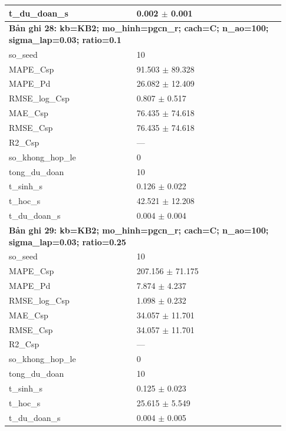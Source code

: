 \begin{longtable}{p{0.43\linewidth}p{0.50\linewidth}}
t\_\allowbreak du\_\allowbreak doan\_\allowbreak s & 0.002 $\pm$ 0.001 \\
\midrule
\multicolumn{2}{p{0.95\linewidth}}{\textbf{Bản ghi 28: kb=KB2; mo\_hinh=pgcn\_r; cach=C; n\_ao=100; sigma\_lap=0.03; ratio=0.1}} \\
so\_\allowbreak seed & 10 \\
MAPE\_\allowbreak Csp & 91.503 $\pm$ 89.328 \\
MAPE\_\allowbreak Pd & 26.082 $\pm$ 12.409 \\
RMSE\_\allowbreak log\_\allowbreak Csp & 0.807 $\pm$ 0.517 \\
MAE\_\allowbreak Csp & 76.435 $\pm$ 74.618 \\
RMSE\_\allowbreak Csp & 76.435 $\pm$ 74.618 \\
R2\_\allowbreak Csp & — \\
so\_\allowbreak khong\_\allowbreak hop\_\allowbreak le & 0 \\
tong\_\allowbreak du\_\allowbreak doan & 10 \\
t\_\allowbreak sinh\_\allowbreak s & 0.126 $\pm$ 0.022 \\
t\_\allowbreak hoc\_\allowbreak s & 42.521 $\pm$ 12.208 \\
t\_\allowbreak du\_\allowbreak doan\_\allowbreak s & 0.004 $\pm$ 0.004 \\
\midrule
\multicolumn{2}{p{0.95\linewidth}}{\textbf{Bản ghi 29: kb=KB2; mo\_hinh=pgcn\_r; cach=C; n\_ao=100; sigma\_lap=0.03; ratio=0.25}} \\
so\_\allowbreak seed & 10 \\
MAPE\_\allowbreak Csp & 207.156 $\pm$ 71.175 \\
MAPE\_\allowbreak Pd & 7.874 $\pm$ 4.237 \\
RMSE\_\allowbreak log\_\allowbreak Csp & 1.098 $\pm$ 0.232 \\
MAE\_\allowbreak Csp & 34.057 $\pm$ 11.701 \\
RMSE\_\allowbreak Csp & 34.057 $\pm$ 11.701 \\
R2\_\allowbreak Csp & — \\
so\_\allowbreak khong\_\allowbreak hop\_\allowbreak le & 0 \\
tong\_\allowbreak du\_\allowbreak doan & 10 \\
t\_\allowbreak sinh\_\allowbreak s & 0.125 $\pm$ 0.023 \\
t\_\allowbreak hoc\_\allowbreak s & 25.615 $\pm$ 5.549 \\
t\_\allowbreak du\_\allowbreak doan\_\allowbreak s & 0.004 $\pm$ 0.005 \\

\end{longtable}
